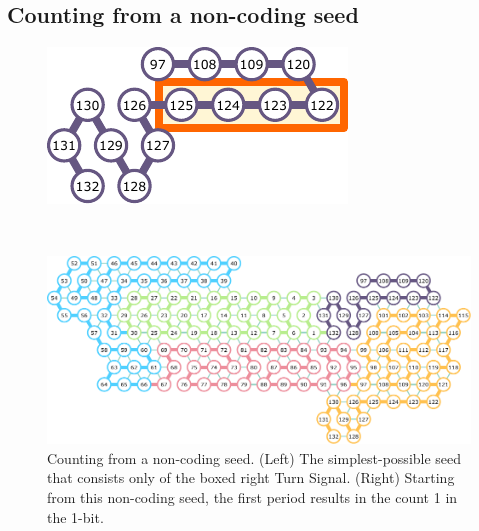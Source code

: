 \documentclass[twocolumn]{svjour3}
\begin{document}
%
%
%
%

\subsection{Counting from a non-coding seed}

\begin{figure}[tb]
\begin{minipage}{0.4\linewidth}
\centering
\includegraphics[width=\linewidth]{fig/svg/zeroBit01.pdf}
\end{minipage}
\begin{minipage}{0.05\linewidth}
\ \\
\end{minipage}
\begin{minipage}{0.45\linewidth}
\centering
\includegraphics[width=\linewidth]{fig/svg/zeroBit05.pdf}
\end{minipage}
\caption{Counting from a non-coding seed.
(Left) The simplest-possible seed that consists only of the boxed right Turn Signal. 
(Right) Starting from this non-coding seed, the first period results in the count 1 in the 1-bit. 
}
\label{fig:noncoding_seed}
\end{figure}
\end{document}
